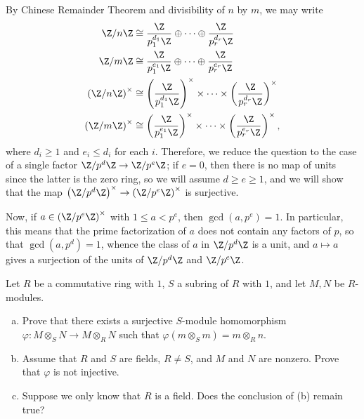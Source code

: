 \documentclass[10pt]{mypackage}
\begin{document}
\begin{solution}
  By Chinese Remainder Theorem and divisibility of $n$ by $m$, we may write
  \begin{align*}
    \Z/n\Z &\cong \frac{\Z}{p_1^{d_1}\Z}\oplus\cdots\oplus \frac{\Z}{p_r^{d_r}\Z}\\
    \Z/m\Z &\cong \frac{\Z}{p_1^{e_1}\Z}\oplus\cdots\oplus \frac{\Z}{p_r^{e_r}\Z}\\
    \left( \Z/n\Z \right)^{\times} &\cong \left( \frac{\Z}{p_1^{d_1}\Z} \right)^{\times}\times\cdots\times \left( \frac{\Z}{p_r^{d_r}\Z} \right)^{\times}\\
    \left( \Z/m\Z \right)^{\times} &\cong \left( \frac{\Z}{p_1^{e_1}\Z} \right)^{\times}\times\cdots\times \left( \frac{\Z}{p_r^{e_r}\Z} \right)^{\times},
  \end{align*}
  where $d_i\geq 1$ and $e_i\leq d_i$ for each $i$. Therefore, we reduce the question to the case of a single factor $\Z/p^{d}\Z\rightarrow \Z/p^e\Z$; if $e = 0$, then there is no map of units since the latter is the zero ring, so we will assume $d\geq e \geq 1$, and we will show that the map $\left( \Z/p^d\Z \right)^{\times}\rightarrow \left( \Z/p^{e}\Z \right)^{\times}$ is surjective.

  Now, if $a\in \left( \Z/p^{e}\Z \right)^{\times}$ with $1\leq a < p^{e}$, then $\gcd\left( a,p^{e} \right) = 1$. In particular, this means that the prime factorization of $a$ does not contain any factors of $p$, so that $\gcd\left( a,p^{d} \right) = 1$, whence the class of $a$ in $\Z/p^{d}\Z$ is a unit, and $a\mapsto a$ gives a surjection of the units of $\Z/p^{d}\Z$ and $\Z/p^{e}\Z$.
\end{solution}
\begin{problem}[Problem 4]
  Let $R$ be a commutative ring with $1$, $S$ a subring of $R$ with $1$, and let $M,N$ be $R$-modules.
  \begin{enumerate}[(a)]
    \item Prove that there exists a surjective $S$-module homomorphism $\varphi\colon M\otimes_{S}N\rightarrow M\otimes_{R}N$ such that $\varphi\left( m\otimes_{S}m \right) = m\otimes_{R}n$.
    \item Assume that $R$ and $S$ are fields, $R\neq S$, and $M$ and $N$ are nonzero. Prove that $\varphi$ is not injective.
    \item Suppose we only know that $R$ is a field. Does the conclusion of (b) remain true?
  \end{enumerate}
\end{problem}
\end{document}

